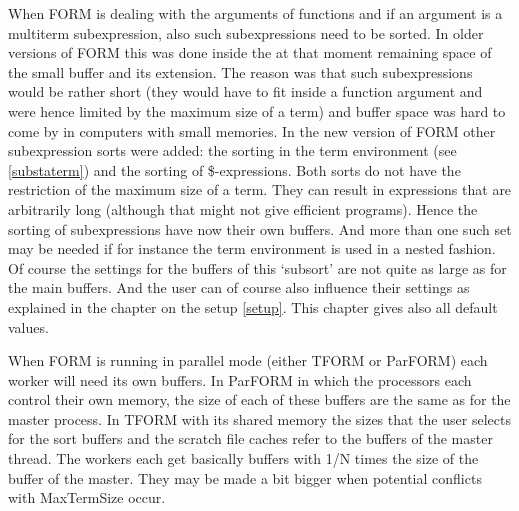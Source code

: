 When FORM is dealing with the arguments of 
functions and if an argument is a multiterm subexpression, also such 
subexpressions need to be sorted. In older versions of FORM this was done 
inside the at that moment remaining space of the small buffer and its 
extension. The reason was that such subexpressions would be rather short 
(they would have to fit inside a function argument and were hence limited 
by the maximum size of a term) and buffer space was hard to come by in 
computers with small memories. In the new version of FORM other 
subexpression sorts were added: the sorting in the term environment (see 
\ref{substaterm}) and the sorting of \$-expressions. Both sorts do not have 
the restriction of the maximum size of a term. They can result in 
expressions that are arbitrarily long (although that might not give 
efficient programs). Hence the sorting of subexpressions have now their own 
buffers. And more than one such set may be needed if for instance the term 
environment is used in a nested fashion. Of course the settings for the 
buffers of this `subsort' are not quite as large as for the main buffers. 
And the user can of course also influence their settings as explained in 
the chapter on the setup \ref{setup}. This chapter gives also all default 
values.

When FORM is running in parallel mode (either TFORM or ParFORM) each worker 
will need its own buffers. In ParFORM in which the processors each control 
their own memory, the size of each of these buffers are the same as for the 
master process. In TFORM with its shared memory the sizes that the user 
selects for the sort buffers and the scratch file caches refer to the 
buffers of the master thread. The workers each get basically buffers with 
1/N times the size of the buffer of the master. They may be made a bit 
bigger when potential conflicts with MaxTermSize occur.

